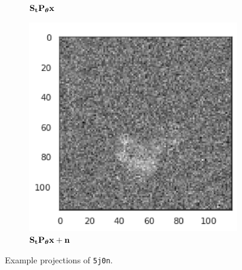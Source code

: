 \begin{figure}[ht!]
\begin{minipage}[b]{0.35\linewidth}
\begin{subfigure}[b]{0.49\linewidth}
            \caption*{$\mathbf{S}_{\mathbf{t}} \mathbf{P}_{{\boldsymbol{\theta}}} \mathbf{x}$}
        \end{subfigure}
        \hfill
        \begin{subfigure}[b]{0.49\linewidth}
            \centering
            \includegraphics[width=0.8\linewidth]{figures/5j0n_noise16_translated}
            \caption*{$\mathbf{S}_{\mathbf{t}} \mathbf{P}_{{\boldsymbol{\theta}}} \mathbf{x} + \mathbf{n}$}
        \end{subfigure}
        \caption{%
            Example projections of \texttt{5j0n}.
        }\label{fig:different-projections}
    \end{minipage}
\end{figure}

